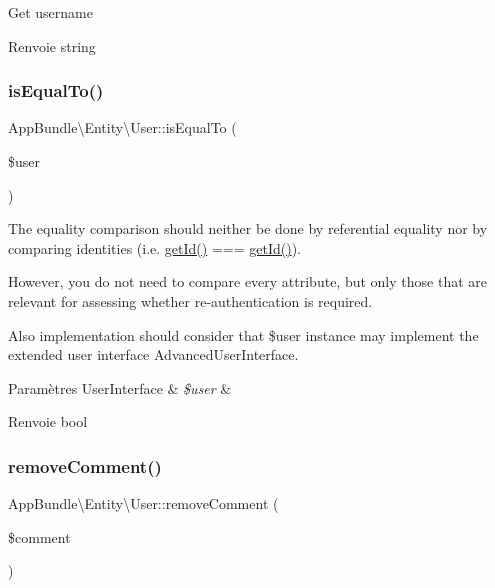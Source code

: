 Get username

\begin{DoxyReturn}{Renvoie}
string 
\end{DoxyReturn}
\mbox{\label{classAppBundle_1_1Entity_1_1User_a6e8354db28000b0b61faace41a09ff7f}} 
\subsubsection{\texorpdfstring{is\+Equal\+To()}{isEqualTo()}}
{\footnotesize\ttfamily App\+Bundle\textbackslash{}\+Entity\textbackslash{}\+User\+::is\+Equal\+To (\begin{DoxyParamCaption}\item[{User\+Interface}]{\$user }\end{DoxyParamCaption})}

The equality comparison should neither be done by referential equality nor by comparing identities (i.\+e. \hyperlink{classAppBundle_1_1Entity_1_1User_aaa021257dad62d5358521ff7b99face1}{get\+Id()} === \hyperlink{classAppBundle_1_1Entity_1_1User_aaa021257dad62d5358521ff7b99face1}{get\+Id()}).

However, you do not need to compare every attribute, but only those that are relevant for assessing whether re-\/authentication is required.

Also implementation should consider that \$user instance may implement the extended user interface {\ttfamily Advanced\+User\+Interface}.


\begin{DoxyParams}[1]{Paramètres}
User\+Interface & {\em \$user} & \\
\hline
\end{DoxyParams}
\begin{DoxyReturn}{Renvoie}
bool 
\end{DoxyReturn}
\mbox{\label{classAppBundle_1_1Entity_1_1User_ad339056b59c0cb14cf5707ffd91a44a3}} 
\subsubsection{\texorpdfstring{remove\+Comment()}{removeComment()}}
{\footnotesize\ttfamily App\+Bundle\textbackslash{}\+Entity\textbackslash{}\+User\+::remove\+Comment (\begin{DoxyParamCaption}\item[{\textbackslash{}\hyperlink{classAppBundle_1_1Entity_1_1EventComment}{App\+Bundle\textbackslash{}\+Entity\textbackslash{}\+Event\+Comment}}]{\$comment }\end{DoxyParamCaption})}

